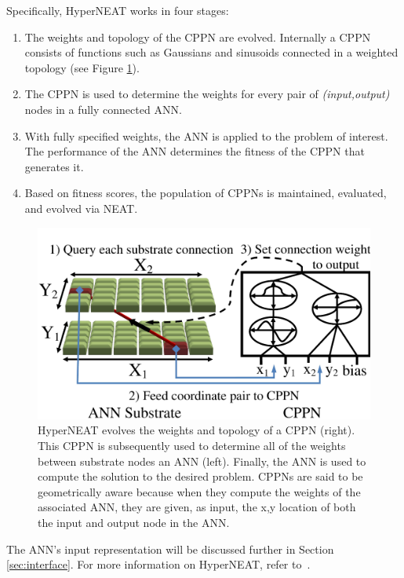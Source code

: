 \documentclass{acm_proc_article-sp}
\begin{document}
Specifically, HyperNEAT works in four stages:

\begin{enumerate}
\item The weights and topology of the CPPN are evolved. Internally a CPPN consists of functions such as Gaussians and sinusoids connected in a weighted topology (see Figure \ref{fig:cppn}).
\item The CPPN is used to determine the weights for every pair of \emph{(input,output)} nodes in a fully connected ANN.
\item With fully specified weights, the ANN is applied to the problem of interest. The performance of the ANN determines the fitness of the CPPN that generates it.
\item Based on fitness scores, the population of CPPNs is maintained, evaluated, and evolved via NEAT.
\end{enumerate}

\begin{figure}[htp]
\begin{center}
\includegraphics[width=\columnwidth]{figures/cppn}
\end{center}
\caption{HyperNEAT evolves the weights and topology of a CPPN (right). This CPPN is subsequently used to determine all of the weights between substrate nodes an ANN (left). Finally, the ANN is used to compute the solution to the desired problem. CPPNs are said to be geometrically aware because when they compute the weights of the associated ANN, they are given, as input, the x,y location of both the input and output node in the ANN.}
\label{fig:cppn}
\end{figure}

The ANN's input representation will be discussed further in Section \ref{sec:interface}. For more information on HyperNEAT, refer to~\cite{gauci08}.
\end{document}
